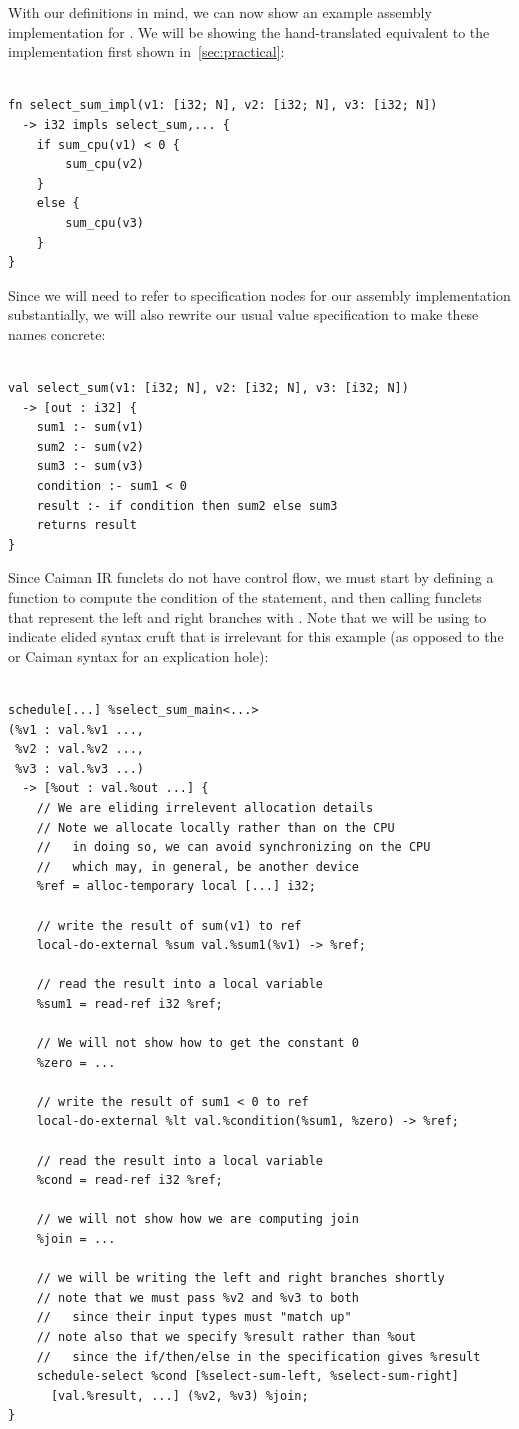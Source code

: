With our definitions in mind, we can now show an example assembly implementation for .  We will be showing the hand-translated equivalent to the implementation first shown in~\ref{sec:practical}:
%
\begin{lstlisting}

fn select_sum_impl(v1: [i32; N], v2: [i32; N], v3: [i32; N]) 
  -> i32 impls select_sum,... {
    if sum_cpu(v1) < 0 { 
        sum_cpu(v2)
    }
    else {
        sum_cpu(v3)
    }
}
\end{lstlisting}
%
Since we will need to refer to specification nodes for our assembly implementation substantially, we will also rewrite our usual value specification to make these names concrete:
%
\begin{lstlisting}

val select_sum(v1: [i32; N], v2: [i32; N], v3: [i32; N]) 
  -> [out : i32] {
    sum1 :- sum(v1)
    sum2 :- sum(v2)
    sum3 :- sum(v3)
    condition :- sum1 < 0
    result :- if condition then sum2 else sum3
    returns result
}
\end{lstlisting}
%
Since Caiman IR funclets do not have control flow, we must start by defining a function to compute the condition of the  statement, and then calling funclets that represent the left and right branches with .  Note that we will be using  to indicate elided syntax cruft that is irrelevant for this example (as opposed to the  or  Caiman syntax for an explication hole):
%
\begin{lstlisting}

schedule[...] %select_sum_main<...>
(%v1 : val.%v1 ..., 
 %v2 : val.%v2 ..., 
 %v3 : val.%v3 ...) 
  -> [%out : val.%out ...] {
    // We are eliding irrelevent allocation details
    // Note we allocate locally rather than on the CPU
    //   in doing so, we can avoid synchronizing on the CPU
    //   which may, in general, be another device
    %ref = alloc-temporary local [...] i32;
    
    // write the result of sum(v1) to ref
    local-do-external %sum val.%sum1(%v1) -> %ref;
    
    // read the result into a local variable
    %sum1 = read-ref i32 %ref;
    
    // We will not show how to get the constant 0
    %zero = ...
    
    // write the result of sum1 < 0 to ref
    local-do-external %lt val.%condition(%sum1, %zero) -> %ref;
    
    // read the result into a local variable
    %cond = read-ref i32 %ref;
    
    // we will not show how we are computing join
    %join = ...
    
    // we will be writing the left and right branches shortly
    // note that we must pass %v2 and %v3 to both
    //   since their input types must "match up"
    // note also that we specify %result rather than %out
    //   since the if/then/else in the specification gives %result
    schedule-select %cond [%select-sum-left, %select-sum-right]
      [val.%result, ...] (%v2, %v3) %join;
}
\end{lstlisting}

